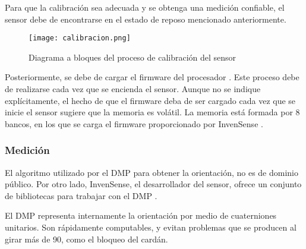 Para que la calibración sea adecuada y se obtenga una medición confiable, el sensor debe de encontrarse en el estado de reposo mencionado anteriormente.

\begin{figure}[htb]
	\centering
	\texttt{[image: calibracion.png]}
	\caption{Diagrama a bloques del proceso de calibración del sensor}
	\label{fig:calibracion}
\end{figure}

\newpage
Posteriormente, se debe de cargar el firmware del procesador \cite{userguideMotionDriver}. Este proceso debe de realizarse cada vez que se encienda el sensor. Aunque no se indique explícitamente, el hecho de que el firmware deba de ser cargado cada vez que se inicie el sensor sugiere que la memoria es volátil. La memoria está formada por 8 bancos, en los que se carga el firmware proporcionado por InvenSense \cite{userguideMotionDriver}. 

\subsubsection{Medición}

El algoritmo utilizado por el DMP para obtener la orientación, no es de dominio público. Por otro lado, InvenSense, el desarrollador del sensor, ofrece un conjunto de bibliotecas para trabajar con el DMP \cite{userguideMotionDriver}.



El DMP representa internamente la orientación por medio de cuaterniones unitarios. Son rápidamente computables, y evitan problemas que se producen al girar más de 90\degree, como el bloqueo del cardán.

